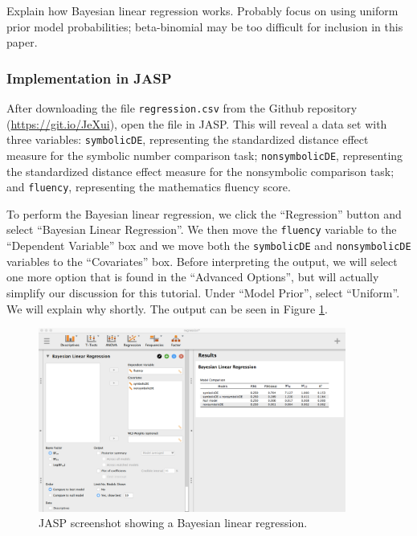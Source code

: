\documentclass[english,,doc,floatsintext]{apa6}
\begin{document}
Explain how Bayesian linear regression works. Probably focus on using uniform prior model probabilities; beta-binomial may be too difficult for inclusion in this paper.

\hypertarget{implementation-in-jasp-1}{%
\subsubsection{Implementation in JASP}\label{implementation-in-jasp-1}}

After downloading the file \texttt{regression.csv} from the Github repository (\url{https://git.io/JeXui}), open the file in JASP. This will reveal a data set with three variables: \texttt{symbolicDE}, representing the standardized distance effect measure for the symbolic number comparison task; \texttt{nonsymbolicDE}, representing the standardized distance effect measure for the nonsymbolic comparison task; and \texttt{fluency}, representing the mathematics fluency score.

To perform the Bayesian linear regression, we click the \enquote{Regression} button and select \enquote{Bayesian Linear Regression}. We then move the \texttt{fluency} variable to the \enquote{Dependent Variable} box and we move both the \texttt{symbolicDE} and \texttt{nonsymbolicDE} variables to the \enquote{Covariates} box. Before interpreting the output, we will select one more option that is found in the \enquote{Advanced Options}, but will actually simplify our discussion for this tutorial. Under \enquote{Model Prior}, select \enquote{Uniform}. We will explain why shortly. The output can be seen in Figure \ref{fig:regression1}.

\begin{figure}
\centering
\includegraphics[width=0.9\textwidth,height=\textheight]{figures/regression1.png}
\caption{\label{fig:regression1}JASP screenshot showing a Bayesian linear regression.}
\end{figure}
\end{document}
